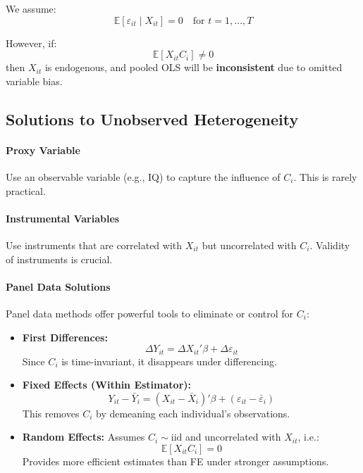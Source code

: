\documentclass[12pt, oneside]{article}
\begin{document}
We assume:
\[
\mathbb{E}[\varepsilon_{it} \mid X_{it}] = 0 \quad \text{for } t = 1, \dots, T
\]

However, if:
\[
\mathbb{E}[X_{it} C_i] \neq 0
\]
then \( X_{it} \) is endogenous, and pooled OLS will be \textbf{inconsistent} due to omitted variable bias.

\subsection*{Solutions to Unobserved Heterogeneity}

\paragraph{Proxy Variable}  
Use an observable variable (e.g., IQ) to capture the influence of \( C_i \). This is rarely practical.

\paragraph{Instrumental Variables}  
Use instruments that are correlated with \( X_{it} \) but uncorrelated with \( C_i \). Validity of instruments is crucial.

\paragraph{Panel Data Solutions}

Panel data methods offer powerful tools to eliminate or control for \( C_i \):

\begin{itemize}
    \item \textbf{First Differences:}
    \[
    \Delta Y_{it} = \Delta X_{it}' \beta + \Delta \varepsilon_{it}
    \]
    Since \( C_i \) is time-invariant, it disappears under differencing.

    \item \textbf{Fixed Effects (Within Estimator):}
    \[
    Y_{it} - \bar{Y}_i = (X_{it} - \bar{X}_i)'\beta + (\varepsilon_{it} - \bar{\varepsilon}_i)
    \]
    This removes \( C_i \) by demeaning each individual's observations.

    \item \textbf{Random Effects:}
    Assumes \( C_i \sim \text{iid} \) and uncorrelated with \( X_{it} \), i.e.:
    \[
    \mathbb{E}[X_{it} C_i] = 0
    \]
    Provides more efficient estimates than FE under stronger assumptions.
\end{itemize}
\end{document}
